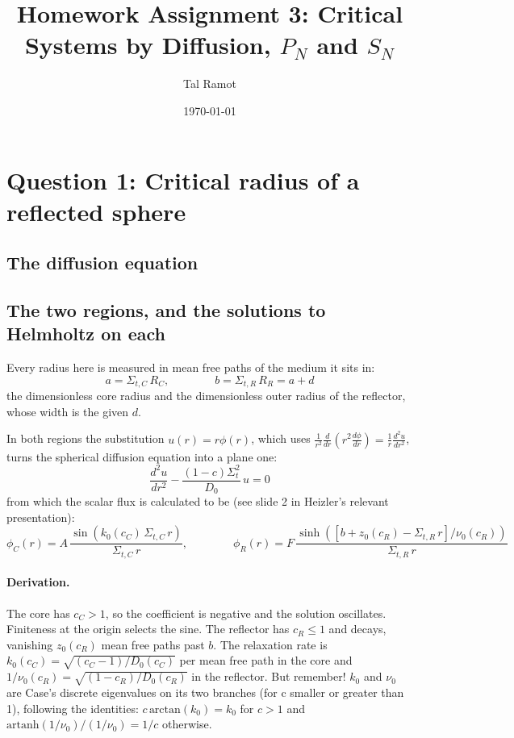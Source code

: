 \documentclass[11pt]{article}
\title{Homework Assignment 3: Critical Systems by Diffusion, $P_N$ and $S_N$}
\author{Tal Ramot}
\date{\today}
\begin{document}
\maketitle

\FloatBarrier
\section*{Question 1: Critical radius of a reflected sphere}
\subsection*{The diffusion equation}



\subsection*{The two regions, and the solutions to Helmholtz on each}

Every radius here is measured in mean free paths of the medium it sits in:
\begin{equation}
    a = \Sigma_{t,C}\,R_C, \qquad\qquad b = \Sigma_{t,R}\,R_R = a + d
    \label{eq:optradii}
\end{equation}
the dimensionless core radius and the dimensionless outer radius of the reflector, whose width is the given $d$.

In both regions the substitution $u(r) = r\phi(r)$, which uses $\frac{1}{r^2}\frac{d}{dr}\left(r^2\frac{d\phi}{dr}\right) = \frac{1}{r}\frac{d^2u}{dr^2}$, turns the spherical diffusion equation into a plane one:
\begin{equation}
    \frac{d^2 u}{dr^2} - \frac{(1-c)\Sigma_t^2}{D_0}\,u = 0
\end{equation}
from which the scalar flux is calculated to be (see slide 2 in Heizler's relevant presentation):
\begin{equation}
    \phi_C(r) = A\,\frac{\sin\!\left(k_0(c_C)\,\Sigma_{t,C}\,r\right)}{\Sigma_{t,C}\,r},
    \qquad\qquad
    \phi_R(r) = F\,\frac{\sinh\!\left(\left[b + z_0(c_R) - \Sigma_{t,R}\,r\right] / \nu_0(c_R)\right)}{\Sigma_{t,R}\,r}
\end{equation}
\paragraph{Derivation.} The core has $c_C > 1$, so the coefficient is negative and the solution oscillates. Finiteness at the origin selects the sine. The reflector has $c_R \le 1$ and decays, vanishing $z_0(c_R)$ mean free paths past $b$. The relaxation rate is $k_0(c_C) = \sqrt{(c_C-1)/D_0(c_C)}$ per mean free path in the core and $1/\nu_0(c_R)=\sqrt{(1-c_R)/D_0(c_R)}$ in the reflector. But remember! $k_0$ and $\nu_0$ are Case's discrete eigenvalues on its two branches (for c smaller or greater than 1), following the identities: $c\,\text{arctan}(k_0) = k_0$ for $c>1$ and $\text{artanh}(1/\nu_0)/(1/\nu_0) = 1/c$ otherwise.
\end{document}
